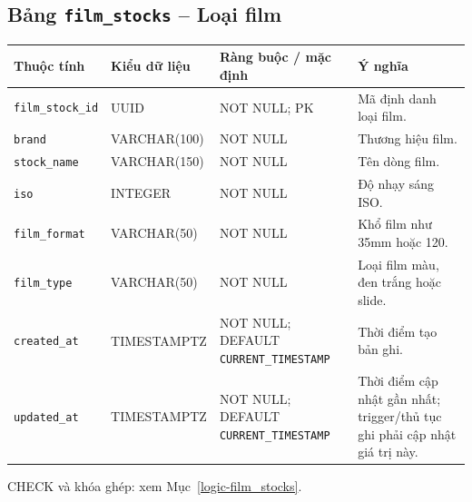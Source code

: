 \subsection{Bảng \texttt{film\_\allowbreak{}stocks} -- Loại film}
\label{dictionary-film_stocks}
\begingroup
\footnotesize
\setlength{\tabcolsep}{3pt}
\begin{longtable}{>{\raggedright\arraybackslash}p{3.1cm}>{\raggedright\arraybackslash}p{2.5cm}>{\raggedright\arraybackslash}p{3.7cm}>{\raggedright\arraybackslash}p{4.3cm}}
\toprule
Thuộc tính & Kiểu dữ liệu & Ràng buộc / mặc định & Ý nghĩa \\
\midrule
\endhead
\texttt{film\_\allowbreak{}stock\_\allowbreak{}id} & UUID & NOT NULL; PK & Mã định danh loại film. \\
\texttt{brand} & VARCHAR(100) & NOT NULL & Thương hiệu film. \\
\texttt{stock\_\allowbreak{}name} & VARCHAR(150) & NOT NULL & Tên dòng film. \\
\texttt{iso} & INTEGER & NOT NULL & Độ nhạy sáng ISO. \\
\texttt{film\_\allowbreak{}format} & VARCHAR(50) & NOT NULL & Khổ film như 35mm hoặc 120. \\
\texttt{film\_\allowbreak{}type} & VARCHAR(50) & NOT NULL & Loại film màu, đen trắng hoặc slide. \\
\texttt{created\_\allowbreak{}at} & TIMESTAMPTZ & NOT NULL; DEFAULT \texttt{CURRENT\_\allowbreak{}TIMESTAMP} & Thời điểm tạo bản ghi. \\
\texttt{updated\_\allowbreak{}at} & TIMESTAMPTZ & NOT NULL; DEFAULT \texttt{CURRENT\_\allowbreak{}TIMESTAMP} & Thời điểm cập nhật gần nhất; trigger/thủ tục ghi phải cập nhật giá trị này. \\
\bottomrule
\end{longtable}
\endgroup
CHECK và khóa ghép: xem Mục~\ref{logic-film_stocks}.
